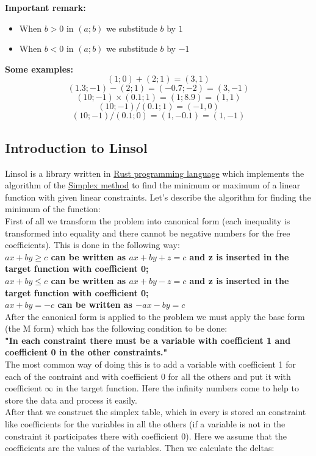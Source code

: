 \documentclass[]{article}
\begin{document}
			\Large{\textbf{Important remark: }}
			\begin{itemize}
				\item When $b>0$ in $ (a; b)$ we substitude $b$ by $1$
				\item When $b<0$ in $ (a; b)$ we substitude $b$ by $-1$
			\end{itemize}
			\textbf{Some examples:}
			$$ (1; 0) + (2; 1) = (3, 1)$$
			$$ (1.3; -1) - (2; 1) = (-0.7; -2) = (3, -1)$$
			$$ (10; -1) \times (0.1; 1) = (1; 8.9) = (1, 1)$$
			$$ (10; -1) / (0.1; 1) = (-1, 0)$$
			$$ (10; -1) / (0.1; 0) = (1, -0.1) = (1, -1)$$
		\subsection{Introduction to Linsol}
			Linsol is a library written in  \href{https://www.rust-lang.org/en-US/}{Rust programming language} which implements the algorithm of the \href{https://en.wikipedia.org/wiki/Simplex_algorithm}{Simplex method} to find the minimum or maximum of a linear function with given linear constraints.
			Let's describe the algorithm for finding the minimum of the function:\\
			First of all we transform the problem into canonical form (each inequality is transformed into equality and there cannot be negative numbers for the free coefficients). This is done in the following way:\\
			\textbf{$ ax + by \geq c$ can be written as $ax + by + z = c$ and z is inserted in the target function with coefficient 0;\\
			$ ax + by \leq c$ can be written as $ax + by - z = c$ and z is inserted in the target function with coefficient 0;\\
			$ ax + by = -c$ can be written as $-ax - by = c$}\\
			After the canonical form is applied to the problem we must apply the base form (the M form) which has the following condition to be done:\\
			\textbf{"In each constraint there must be a variable with coefficient 1 and coefficient 0 in the other constraints."}\\
			The most common way of doing this is to add a variable with coefficient 1 for each of the contraint and with coefficient 0 for all the others and put it with coefficient $\infty$ in the target function. Here the infinity numbers come to help to store the data and process it easily.\\
			After that we construct the simplex table, which in every is stored an constraint like coefficients for the variables in all the others (if a variable is not in the constraint it participates there with coefficient 0). Here we assume that the coefficients are the values of the variables. Then we calculate the deltas:
\end{document}
